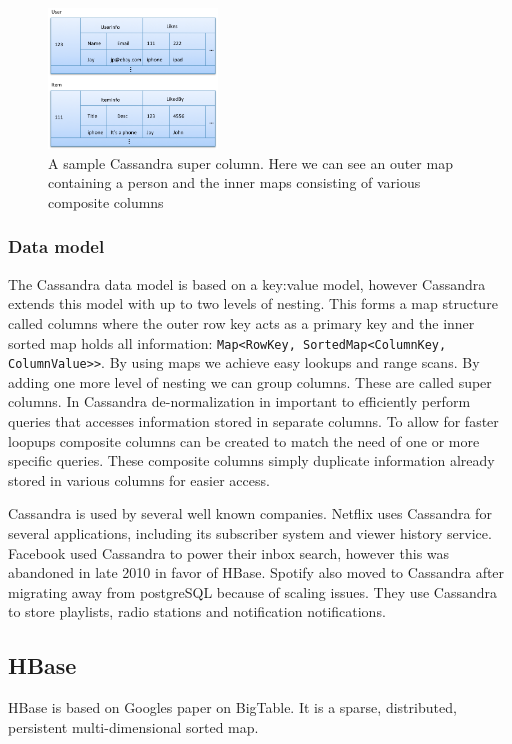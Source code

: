 \begin{figure}[h]
	\centering
	\includegraphics[width=0.4\textwidth]{resources/cas_super_col.png}
	\caption{A sample Cassandra super column. Here we can see an outer map containing a person and the inner maps consisting of various composite columns}
	\label{fig:sample_super_col}
\end{figure}

\subsubsection{Data model}
The Cassandra data model is based on a key:value model, however Cassandra extends this model with up to two levels of nesting. This forms a map structure called columns where the outer row key acts as a primary key and the inner sorted map holds all information: \texttt{Map<RowKey, SortedMap<ColumnKey, ColumnValue>>}. By using maps we achieve easy lookups and range scans. By adding one more level of nesting we can group columns. These are called super columns. 
In Cassandra de-normalization in important to efficiently perform queries that accesses information stored in separate columns. To allow for faster loopups composite columns can be created to match the need of one or more specific queries. These composite columns simply duplicate information already stored in various columns for easier access. 


Cassandra is used by several well known companies. Netflix uses Cassandra for several applications, including its subscriber system and viewer history service. Facebook used Cassandra to power their inbox search, however this was abandoned in late 2010 in favor of HBase. Spotify also moved to Cassandra after migrating away from postgreSQL because of scaling issues. They use Cassandra to store playlists, radio stations and notification notifications.

\subsection{HBase}
HBase is based on Googles paper on BigTable.
It is a sparse, distributed, persistent multi-dimensional sorted map.

